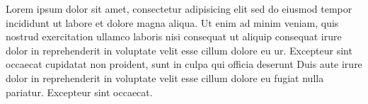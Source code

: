 \documentclass[a4paper, oneside, notitlepage, 12pt]{article}
\begin{document}
\begin{pages}
\begin{Rightside}
Lorem ipsum dolor sit amet, consectetur adipisicing elit
sed do eiusmod tempor incididunt ut labore et dolore
magna aliqua. Ut enim ad minim veniam, quis nostrud
exercitation ullamco laboris nisi
 consequat ut aliquip consequat\pend[\vskip 2ex]
 irure dolor in reprehenderit
in voluptate velit esse cillum dolore eu ur. Excepteur sint occaecat
cupidatat non proident, sunt in culpa qui officia deserunt
Duis aute irure dolor in reprehenderit
in voluptate velit esse cillum dolore eu fugiat nulla
pariatur. Excepteur sint occaecat.
\pend
\endnumbering
\end{Rightside}


\Pages
\end{pages}
\end{document}

